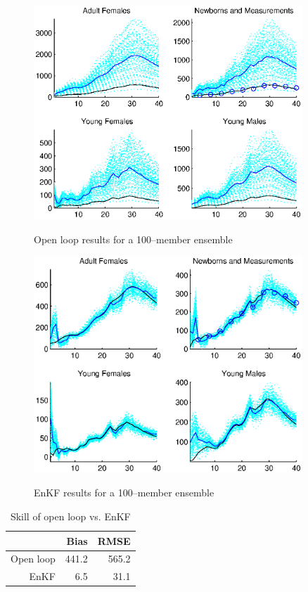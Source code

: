\documentclass[fleqn, letterpaper]{amsart}
\begin{document}
\begin{figure}
\includegraphics[width=0.9\textwidth]{ropenloop}
\label{ol}
\caption{Open loop results for a 100--member ensemble}
\end{figure}
\begin{figure}
\includegraphics[width=0.9\textwidth]{kf}
\label{kf}
\caption{EnKF results for a 100--member ensemble}
\end{figure}
\begin{table}
\begin{tabular}{rrr}
& Bias & RMSE \\
\hline
Open loop & 441.2 & 565.2 \\
EnKF & 6.5 & 31.1
\end{tabular}
\label{initcomp}
\caption{Skill of open loop vs. EnKF}
\end{table}
\end{document}
